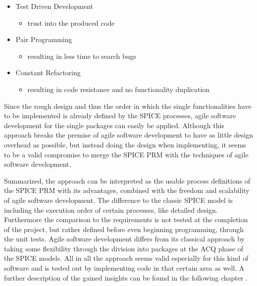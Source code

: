 \begin{itemize}
 \item Test Driven Development
 \begin{itemize}
  \item trust into the produced code
 \end{itemize}

 \item Pair Programming
 \begin{itemize}
  \item resulting in less time to search bugs
 \end{itemize}
 
 \item Constant Refactoring
 \begin{itemize}
  \item resulting in code resistance and no functionality duplication
 \end{itemize}
\end{itemize}

Since the rough design and thus the order in which the single functionalities have to be implemented is already defined by the SPICE processes,
agile software development for the single packages can easily be applied. Although this approach breaks the premise of agile software 
development to have as little design overhead as possible, but instead doing the design when implementing, it seems to be a valid compromise to 
merge the SPICE PRM with the techniques of agile software development. 

Summarized, the approach can be interpreted as the usable process definitions of the SPICE PRM with its advantages, combined with the freedom 
and scalability of agile software development. The difference to the classic SPICE model is including the execution order of certain processes, 
like detailed design. Furthermore the comparison to the requirements is not tested at the completion of the project, but rather defined before 
even beginning programming, through the unit tests. Agile software development differs from its classical approach by taking some flexibility 
through the division into packages at the ACQ phase of the SPICE models. All in all the approach seems valid especially for this kind of 
software and is tested out by implementing code in that certain area as well. A further description of the gained insights can be found in the 
following chapter .

